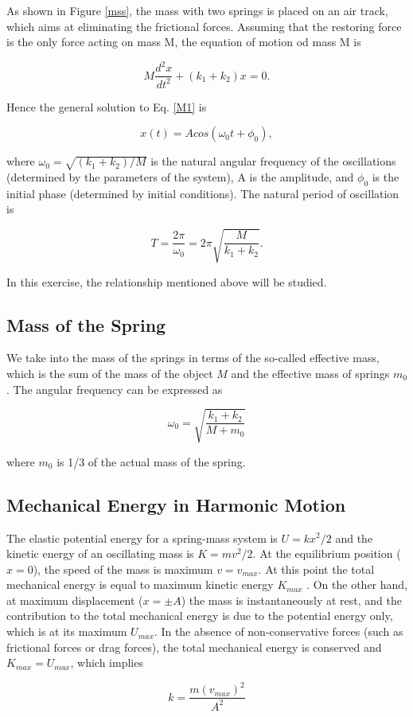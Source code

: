 As shown in Figure \ref{mss}, the mass with two springs is placed on an
air track, which aims at eliminating the frictional forces. Assuming that the
restoring force is the only force acting on mass M, the equation of motion od
mass M is 

\begin{equation}
\label{M1}
M\frac{d^2x}{dt^2}+(k_1+k_2)x=0.
\end{equation}

Hence the general solution to Eq. \ref{M1} is

\begin{equation}
x(t)=Acos(\omega_0t+\phi_0),
\end{equation}

where $\omega_0=\sqrt{(k_1+k_2)/M}$ is the natural angular frequency of the
oscillations (determined by the parameters of the system), A is the amplitude,
and $\phi_0$ is the initial phase (determined by initial conditions). The
natural period of oscillation is 

\begin{equation}
T=\frac{2\pi}{\omega_0}=2\pi\sqrt{\frac{M}{k_1+k_2}}.
\end{equation}
    
In this exercise, the relationship mentioned above will be studied.
    
\subsection{Mass of the Spring}

We take into the mass of the springs in terms of the so-called
effective mass, which is the sum of the mass of the object $M$ and
the effective mass of springs $m_0$.
The angular frequency can be expressed as

\begin{equation}
  \label{omega1}
\omega_0=\sqrt{\frac{k_1+k_2}{M+m_0}}
\end{equation}

where $m_0$ is 1/3 of the actual mass of the spring.

\subsection{Mechanical Energy in Harmonic Motion}

The elastic potential energy for a spring-mass system is $U=kx^2/2$ and the
kinetic energy of an oscillating mass is $K=mv^2/2$. At the equilibrium position
($x=0$), the speed of the mass is maximum $v=v_{max}$. At this point the total
mechanical energy is equal to maximum kinetic energy $K_{max}$ . On the other
hand, at maximum displacement ($x=\pm A$) the mass is instantaneously at rest,
and the contribution to the total mechanical energy is due to the potential
energy only, which is at its maximum $U_{max}$. In the absence of
non-conservative forces (such as frictional forces or drag forces), the total
mechanical energy is conserved and $K_{max}=U_{max}$, which implies 

\begin{equation}
k=\frac{m (v_{max})^2}{A^2}
\end{equation}


